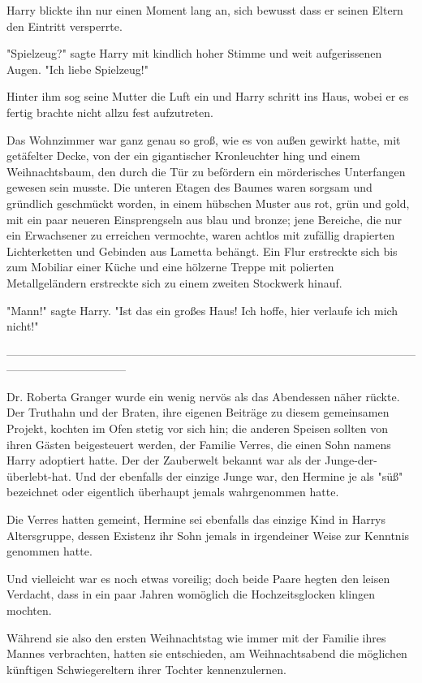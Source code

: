 {Harry blickte ihn nur einen Moment lang an, sich bewusst dass er seinen Eltern den Eintritt versperrte.

"Spielzeug?" sagte Harry mit kindlich hoher Stimme und weit aufgerissenen Augen. "Ich liebe Spielzeug!"

Hinter ihm sog seine Mutter die Luft ein und Harry schritt ins Haus, wobei er es fertig brachte nicht allzu fest aufzutreten.

Das Wohnzimmer war ganz genau so groß, wie es von außen gewirkt hatte, mit getäfelter Decke, von der ein gigantischer Kronleuchter hing und einem Weihnachtsbaum, den durch die Tür zu befördern ein mörderisches Unterfangen gewesen sein musste. Die unteren Etagen des Baumes waren sorgsam und gründlich geschmückt worden, in einem hübschen Muster aus rot, grün und gold, mit ein paar neueren Einsprengseln aus blau und bronze; jene Bereiche, die nur ein Erwachsener zu erreichen vermochte, waren achtlos mit zufällig drapierten Lichterketten und Gebinden aus Lametta behängt. Ein Flur erstreckte sich bis zum Mobiliar einer Küche und eine hölzerne Treppe mit polierten Metallgeländern erstreckte sich zu einem zweiten Stockwerk hinauf.

"Mann!" sagte Harry. "Ist das ein großes Haus! Ich hoffe, hier verlaufe ich mich nicht!"

--------------------------------------------------------------------------------------------------------------------------------------------

Dr. Roberta Granger wurde ein wenig nervös als das Abendessen näher rückte. Der Truthahn und der Braten, ihre eigenen Beiträge zu diesem gemeinsamen Projekt, kochten im Ofen stetig vor sich hin; die anderen Speisen sollten von ihren Gästen beigesteuert werden, der Familie Verres, die einen Sohn namens Harry adoptiert hatte. Der der Zauberwelt bekannt war als der Junge-der-überlebt-hat. Und der ebenfalls der einzige Junge war, den Hermine je als "süß" bezeichnet oder eigentlich überhaupt jemals wahrgenommen hatte.

Die Verres hatten gemeint, Hermine sei ebenfalls das einzige Kind in Harrys Altersgruppe, dessen Existenz ihr Sohn jemals in irgendeiner Weise zur Kenntnis genommen hatte.

Und vielleicht war es noch etwas voreilig; doch beide Paare hegten den leisen Verdacht, dass in ein paar Jahren womöglich die Hochzeitsglocken klingen mochten.

Während sie also den ersten Weihnachtstag wie immer mit der Familie ihres Mannes verbrachten, hatten sie entschieden, am Weihnachtsabend die möglichen künftigen Schwiegereltern ihrer Tochter kennenzulernen.

}
